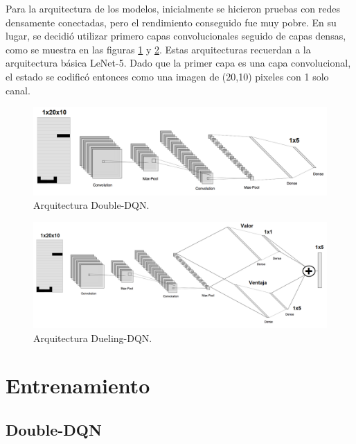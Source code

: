 Para la arquitectura de los modelos, inicialmente se hicieron pruebas con redes densamente conectadas, pero el rendimiento conseguido fue muy pobre. En su lugar, se decidió utilizar primero capas convolucionales seguido de capas densas, como se muestra en las figuras \ref{fig:ddqn} y \ref{fig:dueling-dqn}. Estas arquitecturas recuerdan a la arquitectura básica LeNet-5. Dado que la primer capa es una capa convolucional, el estado se codificó entonces como una imagen de (20,10) pixeles con 1 solo canal.

\begin{figure}[htbp]
	\centering
	\includegraphics[width=\textwidth]{./Figures/ddqn.png}
	\caption{Arquitectura Double-DQN.}
	\label{fig:ddqn}
\end{figure}

\begin{figure}[htbp]
	\centering
	\includegraphics[width=\textwidth]{./Figures/dueling-dqn.png}
	\caption{Arquitectura Dueling-DQN.}
	\label{fig:dueling-dqn}
\end{figure}

\section{Entrenamiento}

\subsection{Double-DQN}
\label{sec:agent_double_dqn}

